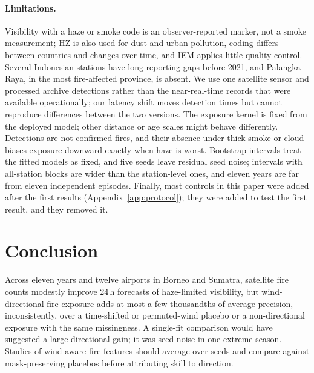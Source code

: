 \paragraph{Limitations.}
Visibility with a haze or smoke code is an observer-reported marker, not a smoke measurement; HZ
is also used for dust and urban pollution, coding differs between countries and changes over
time, and IEM applies little quality control. Several Indonesian stations have long reporting
gaps before 2021, and Palangka Raya, in the most fire-affected province, is absent. We use one
satellite sensor and processed archive detections rather than the near-real-time records that
were available operationally; our latency shift moves detection times but cannot reproduce
differences between the two versions. The exposure kernel is fixed from the deployed model; other
distance or age scales might behave differently. Detections are not confirmed fires, and their
absence under thick smoke or cloud biases exposure downward exactly when haze is worst. Bootstrap
intervals treat the fitted models as fixed, and five seeds leave residual seed noise; intervals
with all-station blocks are wider than the station-level ones, and eleven years are far from
eleven independent episodes. Finally, most controls in this paper were added after the first
results (Appendix~\ref{app:protocol}); they were added to test the first result, and they removed
it.

\section{Conclusion}

Across eleven years and twelve airports in Borneo and Sumatra, satellite fire counts modestly
improve 24\,h forecasts of haze-limited visibility, but wind-directional fire exposure adds at
most a few thousandths of average precision, inconsistently, over a time-shifted or permuted-wind
placebo or a non-directional exposure with the same missingness. A single-fit comparison would have suggested a large
directional gain; it was seed noise in one extreme season. Studies of wind-aware fire features
should average over seeds and compare against mask-preserving placebos before attributing skill
to direction.
